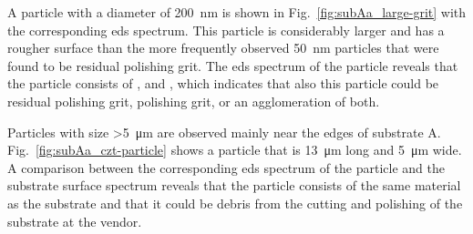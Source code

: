 A particle with a diameter of \SI{200}{\nano\metre} is shown in Fig.~\ref{fig:subAa_large-grit} with the corresponding \ac{eds} spectrum. This particle is considerably larger and has a rougher surface than the more frequently observed \SI{50}{\nano\metre} particles that were found to be residual polishing grit. The \ac{eds} spectrum of the particle reveals that the particle consists of ,  and , which indicates that also this particle could be residual  polishing grit,  polishing grit, or an agglomeration of both.

\begin{comment}
\begin{figure}[htbp]
    \centering
    \subfigure[SEM image at a magnification of 200000$\times$.]{\texttt{[image: substrateA\_a1\_m016.jpg]}\label{fig:substrateA_a1_m016}}
    \quad
    \subfigure[EDS.]{\texttt{[image: eds\_subA\_SiO2.jpg]}\label{fig:subA_200nm_eds}}
    \caption[]{High resolution scanning electron microscopy (SEM) image and the corresponding \acf{eds} spectrum of a particle on substrate A at a magnification of 200000$\times$).}
    \label{fig:subA_partII}
\end{figure}
\end{comment}

Particles with size \SI{>5}{\micro\metre} are observed mainly near the edges of substrate A. Fig.~\ref{fig:subAa_czt-particle} shows a particle that is \SI{13}{\micro\metre} long and \SI{5}{\micro\metre} wide. A comparison between the corresponding \ac{eds} spectrum of the particle and the substrate surface spectrum reveals that the particle consists of the same material as the substrate and that it could be debris from the cutting and polishing of the substrate at the vendor.

\begin{comment}
\begin{figure}[htbp]
    \centering
    \subfigure[SEM image at a magnification of 7000$\times$.]{\texttt{[image: substrateA\_a2\_m011.jpg]}\label{fig:substrateA_a2_m011}}
    \quad
    \subfigure[EDS.]{\texttt{[image: eds\_subA\_CZT.jpg]}\label{fig:eds_subA_CZT}}
    \caption[]{Scanning electron microscopy (SEM) image and the corresponding \acf{eds} spectrum of a particle on substrate A at a magnification of 7000$\times$).}
    \label{fig:subA_czt}
\end{figure}
\end{comment}

